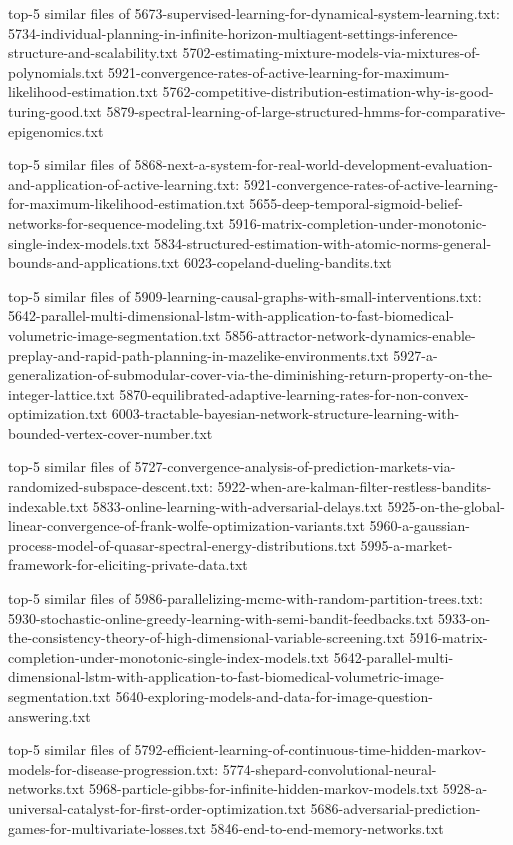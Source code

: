 \documentclass[11pt]{article}
\begin{document}
top-5 similar files of
5673-supervised-learning-for-dynamical-system-learning.txt:
5734-individual-planning-in-infinite-horizon-multiagent-settings-inference-structure-and-scalability.txt
5702-estimating-mixture-models-via-mixtures-of-polynomials.txt
5921-convergence-rates-of-active-learning-for-maximum-likelihood-estimation.txt
5762-competitive-distribution-estimation-why-is-good-turing-good.txt
5879-spectral-learning-of-large-structured-hmms-for-comparative-epigenomics.txt

top-5 similar files of
5868-next-a-system-for-real-world-development-evaluation-and-application-of-active-learning.txt:
5921-convergence-rates-of-active-learning-for-maximum-likelihood-estimation.txt
5655-deep-temporal-sigmoid-belief-networks-for-sequence-modeling.txt
5916-matrix-completion-under-monotonic-single-index-models.txt
5834-structured-estimation-with-atomic-norms-general-bounds-and-applications.txt
6023-copeland-dueling-bandits.txt

top-5 similar files of
5909-learning-causal-graphs-with-small-interventions.txt:
5642-parallel-multi-dimensional-lstm-with-application-to-fast-biomedical-volumetric-image-segmentation.txt
5856-attractor-network-dynamics-enable-preplay-and-rapid-path-planning-in-mazelike-environments.txt
5927-a-generalization-of-submodular-cover-via-the-diminishing-return-property-on-the-integer-lattice.txt
5870-equilibrated-adaptive-learning-rates-for-non-convex-optimization.txt
6003-tractable-bayesian-network-structure-learning-with-bounded-vertex-cover-number.txt

top-5 similar files of
5727-convergence-analysis-of-prediction-markets-via-randomized-subspace-descent.txt:
5922-when-are-kalman-filter-restless-bandits-indexable.txt
5833-online-learning-with-adversarial-delays.txt
5925-on-the-global-linear-convergence-of-frank-wolfe-optimization-variants.txt
5960-a-gaussian-process-model-of-quasar-spectral-energy-distributions.txt
5995-a-market-framework-for-eliciting-private-data.txt

top-5 similar files of
5986-parallelizing-mcmc-with-random-partition-trees.txt:
5930-stochastic-online-greedy-learning-with-semi-bandit-feedbacks.txt
5933-on-the-consistency-theory-of-high-dimensional-variable-screening.txt
5916-matrix-completion-under-monotonic-single-index-models.txt
5642-parallel-multi-dimensional-lstm-with-application-to-fast-biomedical-volumetric-image-segmentation.txt
5640-exploring-models-and-data-for-image-question-answering.txt

top-5 similar files of
5792-efficient-learning-of-continuous-time-hidden-markov-models-for-disease-progression.txt:
5774-shepard-convolutional-neural-networks.txt
5968-particle-gibbs-for-infinite-hidden-markov-models.txt
5928-a-universal-catalyst-for-first-order-optimization.txt
5686-adversarial-prediction-games-for-multivariate-losses.txt
5846-end-to-end-memory-networks.txt
\end{document}
